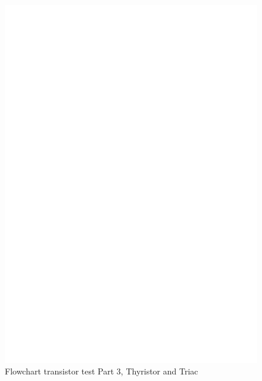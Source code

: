 \begin{figure}[H]
\centering
\includegraphics[]{../FIG/CheckSemi3.eps}
\caption{Flowchart transistor test Part 3, Thyristor and Triac}
\label{fig:ChkSemi3}
\end{figure}


